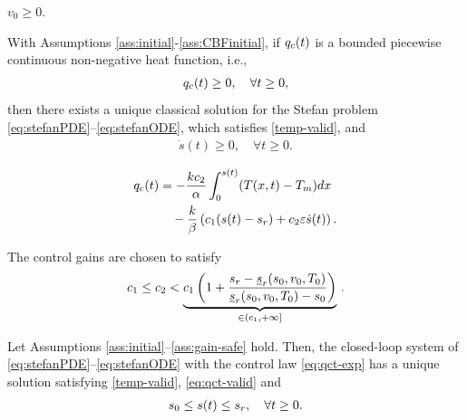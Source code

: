\documentclass[10pt,a4paper]{amsart}
\newcommand{\ep}{\varepsilon}
\begin{document}
 \begin{assum}\label{ass:CBFinitial}
     $v_0 \geq 0$. 
 \end{assum}

 \begin{lemma}\label{lem1}
With Assumptions \ref{ass:initial}-\ref{ass:CBFinitial}, if $q_{\rm c}(t)$ is a bounded piecewise continuous non-negative heat function, i.e.,
\begin{align} \label{eq:qct-valid}
q_{{\rm c}}(t) \geq 0,  \quad \forall t\geq 0,  
\end{align}
then there exists a unique classical solution for the Stefan problem \eqref{eq:stefanPDE}--\eqref{eq:stefanODE}, which satisfies \eqref{temp-valid}, and 
\begin{align} \label{eq:sdot-pos} 
    \dot s(t) \geq 0, \quad \forall t \geq 0. 
\end{align}

\end{lemma}

\begin{align}
    q_{\rm c}(t)
    & = - \frac{ k c_2}{\alpha}  \int_0^{s(t)}  (T(x,t) - T_{\rm m})  dx \notag\\
    & \quad - \frac{k}{\beta} \left (c_1 (s(t) - s_{\rm r}) + c_2\ep  \dot s(t) \right).  \label{eq:qct-exp}
\end{align}

\begin{assum} \label{ass:gain-safe}
    The control gains are chosen to satisfy 
    \begin{align} \label{eq:gain-cond}
        c_1 \leq c_2 < \underbrace{c_1 \left(1+\frac{s_{\rm r} - \underline{s}_{\rm r}(s_0, v_0, T_0)}{ \underline{s}_{\rm r}(s_0, v_0, T_0) - s_0}\right)}_{\in(c_1,+\infty]}\,.
    \end{align}
\end{assum}

\begin{proposition} \label{prop:safety}
    Let Assumptions \ref{ass:initial}--\ref{ass:gain-safe} hold. Then, the closed-loop system of \eqref{eq:stefanPDE}--\eqref{eq:stefanODE} with the control law \eqref{eq:qct-exp} 
    has a unique solution satisfying \eqref{temp-valid}, \eqref{eq:qct-valid} and 
    \begin{align} \label{eq:st-cond}
        s_0 \leq s(t) \leq s_{\rm r}, \quad \forall t \geq 0. 
    \end{align}
\end{proposition}
\end{document}
